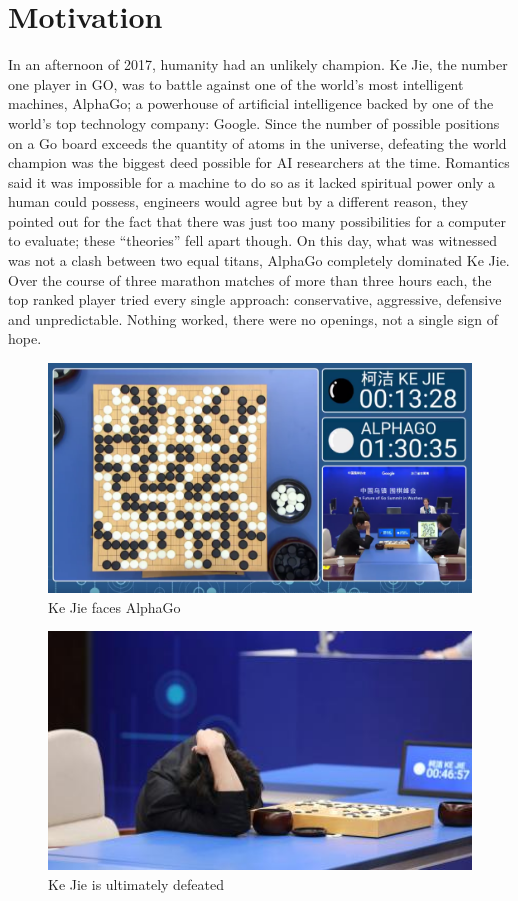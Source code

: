 

\section{Motivation}

In an afternoon of 2017, humanity had an unlikely champion. Ke Jie, the number one player in GO, was to battle against one of the world's most intelligent machines, AlphaGo; a powerhouse of artificial intelligence backed by one of the world's top technology company: Google. Since the number of possible positions on a Go board exceeds the quantity of atoms in the universe, defeating the world champion was the biggest deed possible for AI researchers at the time. Romantics said it was impossible for a machine to do so as it lacked spiritual power only a human could possess, engineers would agree but by a different reason, they pointed out for the fact that there was just too many possibilities for a computer to evaluate; these ``theories'' fell apart though. On this day, what was witnessed was not a clash between two equal titans, AlphaGo  completely dominated Ke Jie. Over the course of three marathon matches of more than three hours each, the top ranked player tried every single approach: conservative, aggressive, defensive and unpredictable. Nothing worked, there were no openings, not a single sign of hope.

\begin{figure}[h]
	\centering
	\includegraphics[width=1.0\textwidth]{Cap1/AlphaGo1.png}
	\caption{Ke Jie faces AlphaGo}
	\label{AlphaGo1}
\end{figure}

\begin{figure}[h]
	\centering
	\includegraphics[width=1.0\textwidth]{Cap1/AlphaGo2}
	\caption{Ke Jie is ultimately defeated}
	\label{AlphaGo2}
\end{figure}

